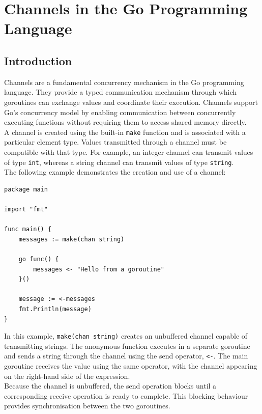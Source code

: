 \section{Channels in the Go Programming Language}

\subsection{Introduction}

Channels are a fundamental concurrency mechanism in the Go programming language. They provide a typed communication mechanism through which goroutines can exchange values and coordinate their execution. Channels support Go's concurrency model by enabling communication between concurrently executing functions without requiring them to access shared memory directly.\\

A channel is created using the built-in \texttt{make} function and is associated with a particular element type. Values transmitted through a channel must be compatible with that type. For example, an integer channel can transmit values of type \texttt{int}, whereas a string channel can transmit values of type \texttt{string}.\\

The following example demonstrates the creation and use of a channel:

\begin{lstlisting}
package main

import "fmt"

func main() {
    messages := make(chan string)

    go func() {
        messages <- "Hello from a goroutine"
    }()

    message := <-messages
    fmt.Println(message)
}
\end{lstlisting}

In this example, \texttt{make(chan string)} creates an unbuffered channel capable of transmitting strings. The anonymous function executes in a separate goroutine and sends a string through the channel using the send operator, \texttt{<-}. The main goroutine receives the value using the same operator, with the channel appearing on the right-hand side of the expression.\\

Because the channel is unbuffered, the send operation blocks until a corresponding receive operation is ready to complete. This blocking behaviour provides synchronisation between the two goroutines.\\

